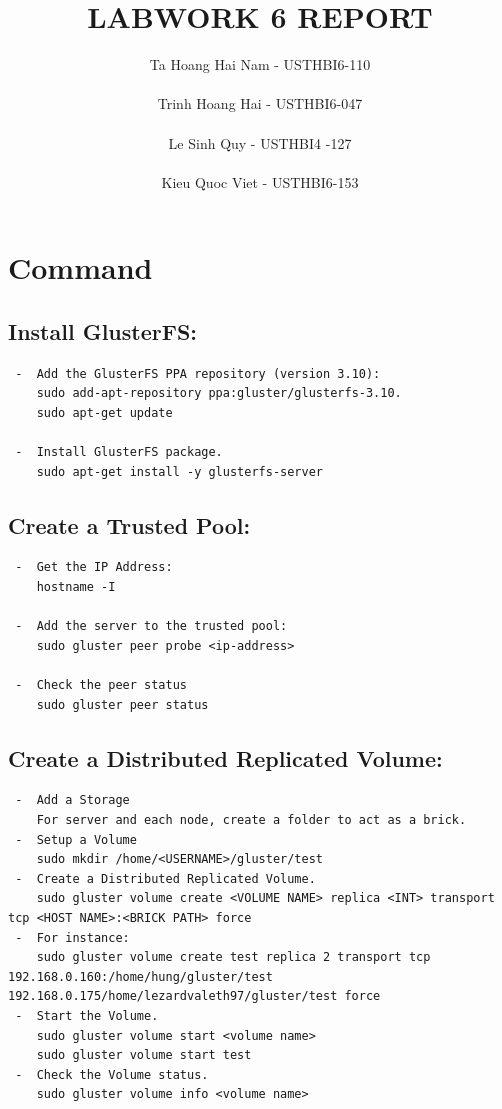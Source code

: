 \documentclass[11pt,a4paper]{article}
\title{LABWORK 6 REPORT}
\author{Ta Hoang Hai Nam - USTHBI6-110 \\ \\ Trinh Hoang Hai - USTHBI6-047 \\ \\ Le Sinh Quy - USTHBI4 -127 \\ \\ Kieu Quoc Viet - USTHBI6-153}
\begin{document}
\maketitle
\newpage 
\section{Command}

\subsection{ Install GlusterFS:}
\begin{lstlisting}
 -  Add the GlusterFS PPA repository (version 3.10):
	sudo add-apt-repository ppa:gluster/glusterfs-3.10. 
	sudo apt-get update

 -  Install GlusterFS package.
	sudo apt-get install -y glusterfs-server

\end{lstlisting}

\subsection{ Create a Trusted Pool:}

\begin{lstlisting}
 -  Get the IP Address: 
	hostname -I

 -  Add the server to the trusted pool: 
	sudo gluster peer probe <ip-address>

 -  Check the peer status
	sudo gluster peer status

\end{lstlisting}
\subsection{ Create a Distributed Replicated Volume:}
\begin{lstlisting} 
 -  Add a Storage
	For server and each node, create a folder to act as a brick.
 -  Setup a Volume
	sudo mkdir /home/<USERNAME>/gluster/test
 -  Create a Distributed Replicated Volume.
	sudo gluster volume create <VOLUME NAME> replica <INT> transport tcp <HOST NAME>:<BRICK PATH> force
 -  For instance:
	sudo gluster volume create test replica 2 transport tcp 192.168.0.160:/home/hung/gluster/test 192.168.0.175/home/lezardvaleth97/gluster/test force
 -  Start the Volume.
	sudo gluster volume start <volume name>
	sudo gluster volume start test
 -  Check the Volume status.
	sudo gluster volume info <volume name>
\end{lstlisting}
\end{document}
